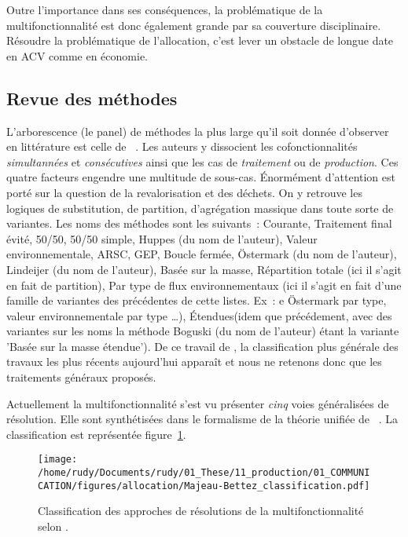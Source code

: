 Outre l'importance dans ses conséquences, la problématique de la multifonctionnalité est donc également grande par sa couverture disciplinaire.
Résoudre la problématique de l'allocation, c'est lever un obstacle de longue date en ACV comme en économie.

\subsection{Revue des méthodes}
L’arborescence (le panel) de méthodes la plus large qu'il soit donnée d'observer en littérature est celle de \citeauthor{schneider_analyse_1998}~\cite{schneider_analyse_1998}.
Les auteurs y dissocient les cofonctionnalités \emph{simultannées} et \emph{consécutives} ainsi que les cas de \emph{traitement} ou de \emph{production}.
Ces quatre facteurs engendre une multitude de sous-cas.
Énormément d'attention est porté sur la question de la revalorisation et des déchets.
On y retrouve les logiques de substitution, de partition, d'agrégation massique dans toute sorte de variantes.
Les noms des méthodes sont les suivants~:
Courante,
Traitement final évité,
50/50,
50/50 simple,
Huppes (du nom de l'auteur),
Valeur environnementale,
ARSC,
GEP,
Boucle fermée,
Östermark (du nom de l'auteur),
Lindeijer (du nom de l'auteur),
Basée sur la masse,
Répartition totale (ici il s'agit en fait de partition),
Par type de flux environnementaux (ici il s'agit en fait d'une famille de variantes des précédentes de cette listes. Ex~: e Östermark par type, valeur environnementale par type \ldots),
Étendues(idem que précédement, avec des variantes sur les noms la méthode Boguski (du nom de l'auteur) étant la variante 'Basée sur la masse étendue').
De ce travail de \citeyear{schneider_analyse_1998}, la classification plus générale des travaux les plus récents aujourd'hui apparaît et nous ne retenons donc que les traitements généraux proposés.

Actuellement la multifonctionnalité s'est vu présenter \emph{cinq} voies généralisées de résolution.
Elle sont synthétisées dans le formalisme de la théorie unifiée de \citeauthor{majeau-bettez_unified_2014}~\cite{majeau-bettez_unified_2014}.
La classification est représentée figure~\ref{fig:Majeau-classification}.
\begin{figure}[htbp]
\texttt{[image: /home/rudy/Documents/rudy/01\_These/11\_production/01\_COMMUNICATION/figures/allocation/Majeau-Bettez\_classification.pdf]}
\caption{Classification des approches de résolutions de la multifonctionnalité selon \citeauthor{majeau-bettez_unified_2014}.}
\label{fig:Majeau-classification}
\end{figure}


